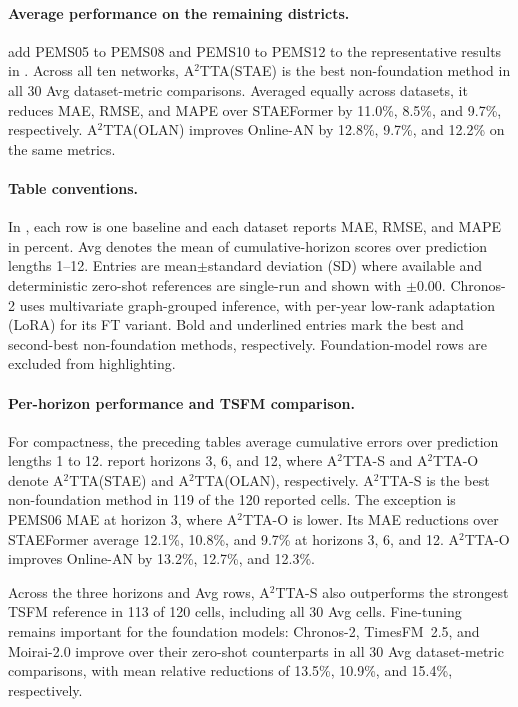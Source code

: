 \paragraph{Average performance on the remaining districts.}
 add PEMS05 to PEMS08 and PEMS10 to PEMS12 to the representative results in . Across all ten networks, A$^2$TTA\allowbreak(STAE) is the best non-foundation method in all 30 Avg dataset-metric comparisons. Averaged equally across datasets, it reduces MAE, RMSE, and MAPE over STAEFormer by 11.0\%, 8.5\%, and 9.7\%, respectively. A$^2$TTA\allowbreak(OLAN) improves Online-AN by 12.8\%, 9.7\%, and 12.2\% on the same metrics.

\paragraph{Table conventions.}
In , each row is one
baseline and each dataset reports MAE, RMSE, and MAPE in percent. Avg denotes
the mean of cumulative-horizon scores over prediction lengths 1--12. Entries
are mean$\pm$standard deviation (SD) where available and deterministic zero-shot references are
single-run and shown with $\pm0.00$. Chronos-2 uses multivariate graph-grouped
inference, with per-year low-rank adaptation (LoRA) for its FT variant. Bold and
underlined entries mark the best and second-best non-foundation methods,
respectively. Foundation-model rows are excluded from highlighting.





\paragraph{Per-horizon performance and TSFM comparison.}
For compactness, the preceding tables average cumulative errors over prediction lengths 1 to 12.  report horizons 3, 6, and 12, where A$^2$TTA-S and A$^2$TTA-O denote A$^2$TTA(STAE) and A$^2$TTA(OLAN), respectively. A$^2$TTA-S is the best non-foundation method in 119 of the 120 reported cells. The exception is PEMS06 MAE at horizon 3, where A$^2$TTA-O is lower. Its MAE reductions over STAEFormer average 12.1\%, 10.8\%, and 9.7\% at horizons 3, 6, and 12. A$^2$TTA-O improves Online-AN by 13.2\%, 12.7\%, and 12.3\%.

Across the three horizons and Avg rows, A$^2$TTA-S also outperforms the strongest TSFM reference in 113 of 120 cells, including all 30 Avg cells. Fine-tuning remains important for the foundation models: Chronos-2, TimesFM~2.5, and Moirai-2.0 improve over their zero-shot counterparts in all 30 Avg dataset-metric comparisons, with mean relative reductions of 13.5\%, 10.9\%, and 15.4\%, respectively.

